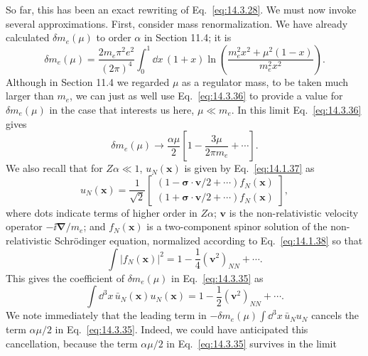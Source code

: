 So far, this has been an exact rewriting of Eq.~\eqref{eq:14.3.28}. We must
now invoke several approximations. First, consider mass renormalization. We
have already calculated $\delta m_e(\mu)$ to order $\alpha$ in Section 11.4;
it is
\begin{equation}
\delta m_e(\mu)=\frac{2m_e\pi^2e^2}{(2\pi)^4}
\int_0^1\dd x\,(1+x)\ln\left(
\frac{m_e^2x^2+\mu^2(1-x)}{m_e^2x^2}\right).
\tag{14.3.36}\label{eq:14.3.36}
\end{equation}
Although in Section 11.4 we regarded $\mu$ as a regulator mass, to be taken
much larger than $m_e$, we can just as well use Eq.~\eqref{eq:14.3.36} to
provide a value for $\delta m_e(\mu)$ in the case that interests us here,
$\mu\ll m_e$. In this limit Eq.~\eqref{eq:14.3.36} gives
\begin{equation}
\delta m_e(\mu)\longrightarrow\frac{\alpha\mu}{2}
\left[1-\frac{3\mu}{2\pi m_e}+\cdots\right].
\tag{14.3.37}\label{eq:14.3.37}
\end{equation}
We also recall that for $Z\alpha\ll1$, $u_N(\mathbf x)$ is given by
Eq.~\eqref{eq:14.1.37} as
\begin{equation}
u_N(\mathbf x)=\frac{1}{\sqrt2}
\begin{bmatrix}
(1-\boldsymbol\sigma\cdot\mathbf v/2+\cdots)f_N(\mathbf x)\\
(1+\boldsymbol\sigma\cdot\mathbf v/2+\cdots)f_N(\mathbf x)
\end{bmatrix},
\tag{14.3.38}\label{eq:14.3.38}
\end{equation}
where dots indicate terms of higher order in $Z\alpha$; $\mathbf v$ is the
non-relativistic velocity operator $-\ii\boldsymbol\nabla/m_e$; and
$f_N(\mathbf x)$ is a two-component spinor solution of the non-relativistic
Schrödinger equation, normalized according to Eq.~\eqref{eq:14.1.38} so that
\begin{equation}
\int|f_N(\mathbf x)|^2=1-\frac14(\mathbf v^2)_{NN}+\cdots.
\tag{14.3.39}\label{eq:14.3.39}
\end{equation}
This gives the coefficient of $\delta m_e(\mu)$ in Eq.~\eqref{eq:14.3.35} as
\begin{equation}
\int \dd^3x\,\bar u_N(\mathbf x)u_N(\mathbf x)
=1-\frac12(\mathbf v^2)_{NN}+\cdots.
\tag{14.3.40}\label{eq:14.3.40}
\end{equation}
We note immediately that the leading term in
$-\delta m_e(\mu)\int \dd^3x\,\bar u_Nu_N$ cancels the term $\alpha\mu/2$ in
Eq.~\eqref{eq:14.3.35}. Indeed, we could have anticipated this cancellation,
because the term $\alpha\mu/2$ in Eq.~\eqref{eq:14.3.35} survives in the limit
